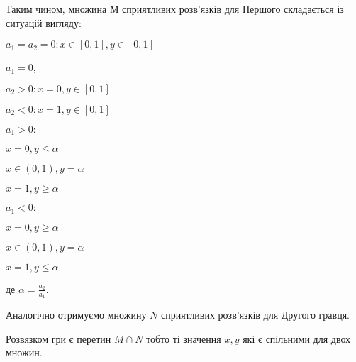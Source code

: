 \documentclass[12pt,a4paper]{book}
\newenvironment{slim_enumerate}{
\begin{enumerate}
  \setlength{\itemsep}{1pt}
  \setlength{\parskip}{0pt}
  \setlength{\parsep}{0pt}}
{\end{enumerate}}
\newenvironment{slim_itemize}{
\begin{itemize}
  \setlength{\itemsep}{1pt}
  \setlength{\parskip}{0pt}
  \setlength{\parsep}{0pt}}
{\end{itemize}}
\begin{document}
Таким чином, множина $М$ сприятливих розв’язків для Першого складається із ситуацій вигляду:
\begin{slim_itemize}
  \item $a_1=a_2=0: x \in [0,1], y \in [0,1]$
  \item $a_1=0$,
  \begin{slim_enumerate}
    \item $a_2>0: x=0, y \in [0,1]$
    \item $a_2<0: x=1, y \in [0,1]$
  \end{slim_enumerate}
    \item $a_1>0:$
    \begin{slim_itemize}
      \item $x=0, y \leq \alpha$
      \item $x \in (0,1), y=\alpha$
      \item $x=1, y \geq \alpha$
    \end{slim_itemize}
    \item $a_1<0:$
    \begin{slim_itemize}
      \item $x=0, y \geq \alpha$
      \item $x \in (0,1), y=\alpha$
      \item $x=1, y \leq \alpha$
    \end{slim_itemize}
\end{slim_itemize}
де $\displaystyle \alpha = \frac{a_2}{a_1}$.

Аналогічно отримуємо множину $N$ сприятливих розв’язків для Другого гравця.

Розвязком гри є перетин $M \cap N$ тобто ті значення $x,y$ які є спільними для двох множин.
\end{document}
